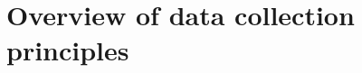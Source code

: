 %
%
%
%
%
%
%
%
%



\section{Overview of data collection principles}
\label{overviewOfDataCollectionPrinciples}

